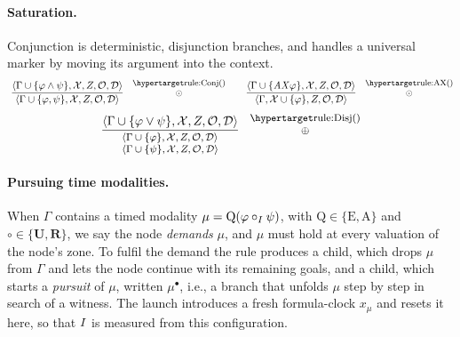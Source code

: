 \paragraph{Saturation.}
Conjunction  is deterministic, disjunction  branches, and  handles a universal marker by moving its argument into the context. %
\vspace{-0.1cm}
\[
\footnotesize
\ \frac{\tup{\Gamma\cup\{\varphi\land\psi\}}{\Ctx}{Z}{\obligations}{\Deadline}}
{\tup{\Gamma\cup\{\varphi,\psi\}}{\Ctx}{Z}{\obligations}{\Deadline}}\quad
\shortstack{\ruleanchor{Conj}\\\DETn}
\qquad
\ \frac{\tup{\Gamma\cup\{\AX\varphi\}}{\Ctx}{Z}{\obligations}{\Deadline}}
{\tup{\Gamma}{\Ctx\cup\{\varphi\}}{Z}{\obligations}{\Deadline}}\quad
\shortstack{\ruleanchor{AX}\\ \DETn}
\]\vspace{-0.2cm}
\[
\footnotesize
\frac{\tup{\Gamma\cup\{\varphi\lor\psi\}}{\Ctx}{Z}{\obligations}{\Deadline}}
{
\begin{array}{ll}
\tup{\Gamma\cup\{\varphi\}}{\Ctx}{Z}{\obligations}{\Deadline}\\
  \tup{\Gamma\cup\{\psi\}}{\Ctx}{Z}{\obligations}{\Deadline}
\end{array}
}
%
\quad
\shortstack{\ruleanchor{Disj}\\\ORn
}
\]

\paragraph{Pursuing time modalities.}

When $\Gamma$ contains a timed modality $\mu=\mathrm{Q}(\varphi\circ_I\psi)$, with
$\mathrm{Q}\in\{\mathrm{E},\mathrm{A}\}$ and $\circ\in\{\mathbf{U},\mathbf{R}\}$, we say the node
\emph{demands} $\mu$, and $\mu$ must hold at every valuation of the node's zone. To fulfil the demand the rule produces a  child, which drops $\mu$ from
$\Gamma$ and lets the node continue with its remaining goals, and a  child, which
starts a \emph{pursuit} of $\mu$, written $\mu^\bullet$, i.e., a branch that unfolds $\mu$ step by
step in search of a witness. The launch introduces a fresh formula-clock $x_\mu$ and resets it
here, so that $I$ is measured from this configuration.

